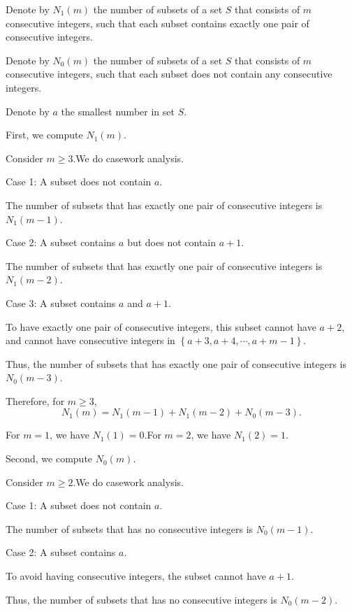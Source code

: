 \begin{enumerate}
{{Denote by $N_1 \left( m \right)$ the number of subsets of a set $S$ that consists of $m$ consecutive integers, such that each subset contains exactly one pair of consecutive integers.

 Denote by $N_0 \left( m \right)$ the number of subsets of a set $S$ that consists of $m$ consecutive integers, such that each subset does not contain any consecutive integers.

 Denote by $a$ the smallest number in set $S$.

 First, we compute $N_1 \left( m \right)$.

 Consider $m \geq 3$.We do casework analysis.

 Case 1: A subset does not contain $a$.

 The number of subsets that has exactly one pair of consecutive integers is $N_1 \left( m - 1 \right)$.

 Case 2: A subset contains $a$ but does not contain $a + 1$.

 The number of subsets that has exactly one pair of consecutive integers is $N_1 \left( m - 2 \right)$.

 Case 3: A subset contains $a$ and $a + 1$.

 To have exactly one pair of consecutive integers, this subset cannot have $a + 2$, and cannot have consecutive integers in $\left\{ a+3, a+4, \cdots , a + m - 1 \right\}$.

 Thus, the number of subsets that has exactly one pair of consecutive integers is $N_0 \left( m - 3 \right)$.

 Therefore, for $m \geq 3$,
 \[N_1 \left( m \right) = N_1 \left( m - 1 \right) + N_1 \left( m - 2 \right) + N_0 \left( m - 3 \right) .\]

 For $m = 1$, we have $N_1 \left( 1 \right) = 0$.For $m = 2$, we have $N_1 \left( 2 \right) = 1$.

 
Second, we compute $N_0 \left( m \right)$.

 Consider $m \geq 2$.We do casework analysis.

 Case 1: A subset does not contain $a$.

 The number of subsets that has no consecutive integers is $N_0 \left( m - 1 \right)$.

 Case 2: A subset contains $a$.

 To avoid having consecutive integers, the subset cannot have $a + 1$.

 Thus, the number of subsets that has no consecutive integers is $N_0 \left( m - 2 \right)$.

}}
\end{enumerate}
